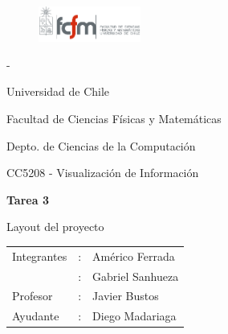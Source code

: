 \documentclass[letterpaper,10pt]{article}
\begin{document}
	\begin{titlepage}

		\begin{figure}
			\includegraphics[width=0.3\textwidth]{logoFCFM.png}
		\end{figure}

		\noindent \phantom - %

		Universidad de Chile

		Facultad de Ciencias Físicas y Matemáticas

		Depto. de Ciencias de la Computación

		CC5208 - Visualización de Información

		\vfill

		\begin{center}
			\begin{Huge}
				{\textbf{Tarea 3}}
			\end{Huge}

			\begin{large}
				Layout del proyecto
			\end{large}

		\end{center}

		\vfill

		\begin{flushright}
			\begin{tabular}{lll}
				Integrantes	&:	& Américo Ferrada\\
						&:	& Gabriel Sanhueza\\
				Profesor	&:	& Javier Bustos\\
				Ayudante	&:	& Diego Madariaga\\
			\end{tabular}
		\end{flushright}

	\end{titlepage}

	\newpage
\end{document}
